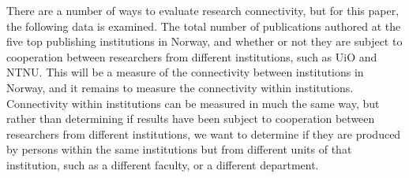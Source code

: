 There are a number of ways to evaluate research connectivity, but for this paper, the following data is examined.
The total number of publications authored at the five top publishing institutions in Norway, and whether or not they are subject to cooperation between researchers from different institutions, such as UiO and NTNU.
This will be a measure of the connectivity between institutions in Norway, and it remains to measure the connectivity within institutions.
Connectivity within institutions can be measured in much the same way, but rather than determining if results have been subject to cooperation between researchers from different institutions, we want to determine if they are produced by persons within the same institutions but from different units of that institution, such as a different faculty, or a different department.
